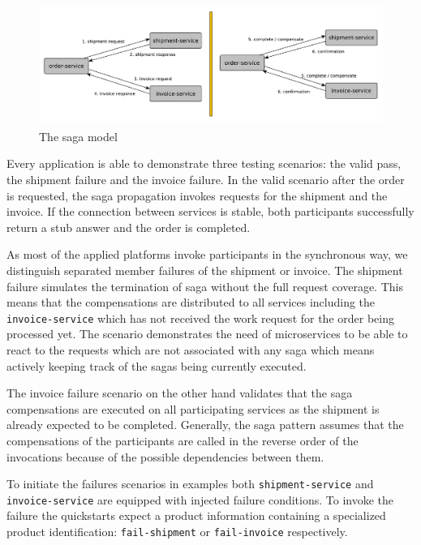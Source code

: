 \documentclass[oneside,
  digital, %
  table,   %
  nolof,     %
  nolot,     %
]{fithesis3}
\begin{document}
\begin{figure}
    \begin{center}
        \includegraphics[height=40mm]{images/sagaModel.pdf}
    \end{center}
    \caption{The saga model}
\end{figure}

Every application is able to demonstrate three testing scenarios: the valid pass, the shipment failure and the invoice failure. In the valid scenario after the order is requested, the saga propagation invokes requests for the shipment and the invoice. If the connection between services is stable, both participants successfully return a stub answer and the order is completed. 

As most of the applied platforms invoke participants in the synchronous way, we distinguish separated member failures of the shipment or invoice. The shipment failure simulates the termination of saga without the full request coverage. This means that the compensations are distributed to all services including the \texttt{invoice-service} which has not received the work request for the order being processed yet. The scenario demonstrates the need of microservices to be able to react to the requests which are not associated with any saga which means actively keeping track of the sagas being currently executed. 

The invoice failure scenario on the other hand validates that the saga compensations are executed on all participating services as the shipment is already expected to be completed. Generally, the saga pattern assumes that the compensations of the participants are called in the reverse order of the invocations because of the possible dependencies between them.

To initiate the failures scenarios in examples both \texttt{shipment-service} and \texttt{invoice-service} are equipped with injected failure conditions. To invoke the failure the quickstarts expect a product information containing a specialized product identification: \texttt{fail-shipment} or \texttt{fail-invoice} respectively. 
\end{document}
